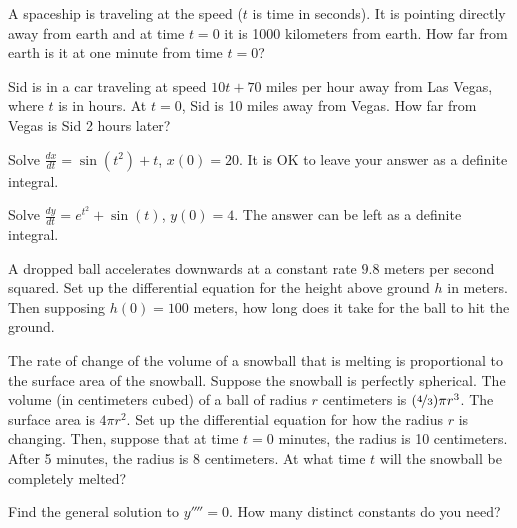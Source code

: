 \documentclass{ximera}
\begin{document}
\begin{exercise}
    A spaceship is traveling at the speed  ($t$ is time in seconds).  It is pointing directly away from earth and at time $t=0$ it is 1000 kilometers from earth.  How far from earth is it at one minute from time $t=0$?
\end{exercise}

\begin{exercise}
    Sid is in a car traveling at speed $10t+70$ miles per hour away from Las Vegas, where $t$ is in hours.  At $t=0$, Sid is 10 miles away from Vegas.  How far from Vegas is Sid 2 hours later?
\end{exercise}

\begin{exercise}
    Solve $\frac{dx}{dt} = \sin(t^2)+t$, $x(0)=20$.  It is OK to leave your answer as a definite integral.
\end{exercise}

\begin{exercise}
    Solve $\frac{dy}{dt} = e^{t^2} + \sin(t)$, $y(0) = 4$. The answer can be left as a definite integral. 
\end{exercise}

\begin{exercise}
    A dropped ball accelerates downwards at a constant rate $9.8$ meters per second squared.  Set up the differential equation for the height above ground $h$ in meters. Then supposing $h(0) = 100$ meters, how long does it take for the ball to hit the ground.
\end{exercise}

\begin{exercise}
    The rate of change of the volume of a snowball that is melting is  proportional to the surface area of the snowball.  Suppose the snowball is perfectly spherical.  The volume (in centimeters cubed) of a ball of radius $r$ centimeters is $(\nicefrac{4}{3}) \pi r^3$.  The surface area is $4 \pi r^2$.  Set up the differential equation for how the radius $r$ is changing. Then, suppose that at time $t=0$ minutes, the radius is 10 centimeters. After 5 minutes, the radius is 8 centimeters.  At what time $t$ will the  snowball be completely melted?
\end{exercise}

\begin{exercise}%
    Find the general solution to $y''''= 0$.  How many distinct constants do you need?
\end{exercise}
%
\end{document}
